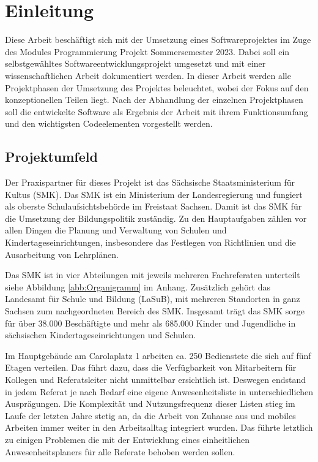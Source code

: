 \section{Einleitung}
\label{sec:Einleitung}
Diese Arbeit beschäftigt sich mit der Umsetzung eines Softwareprojektes im Zuge des Modules Programmierung Projekt Sommersemester 2023. Dabei soll ein selbstgewähltes Softwareentwicklungsprojekt umgesetzt und mit einer wissenschaftlichen Arbeit dokumentiert werden. In dieser Arbeit werden alle Projektphasen der Umsetzung des Projektes beleuchtet, wobei der Fokus auf den konzeptionellen Teilen liegt. Nach der Abhandlung der einzelnen Projektphasen soll die entwickelte Software als Ergebnis der Arbeit mit ihrem Funktionsumfang und den wichtigsten Codeelementen vorgestellt werden.

\subsection{Projektumfeld}
\label{sec:Projektumfeld}
Der Praxispartner für dieses Projekt ist das Sächsische Staatsministerium für Kultus (SMK). Das SMK ist ein Ministerium der Landesregierung und fungiert als oberste Schulaufsichtsbehörde im Freistaat Sachsen. Damit ist das SMK für die Umsetzung der Bildungspolitik zuständig. Zu den Hauptaufgaben zählen vor allen Dingen die Planung und Verwaltung von Schulen und Kindertageseinrichtungen, insbesondere das Festlegen von Richtlinien und die Ausarbeitung von Lehrplänen.

Das SMK ist in vier Abteilungen mit jeweils mehreren Fachreferaten unterteilt siehe Abbildung \ref{abb:Organigramm} im Anhang. Zusätzlich gehört das Landesamt für Schule und Bildung (LaSuB), mit mehreren Standorten in ganz Sachsen zum nachgeordneten Bereich des SMK. Insgesamt trägt das SMK sorge für über 38.000 Beschäftigte und mehr als 685.000 Kinder und Jugendliche in sächsischen Kindertageseinrichtungen und Schulen.

Im Hauptgebäude am Carolaplatz 1 arbeiten ca. 250 Bedienstete die sich auf fünf Etagen verteilen. Das führt dazu, dass die Verfügbarkeit von Mitarbeitern für Kollegen und Referatsleiter nicht unmittelbar ersichtlich ist. Deswegen endstand in jedem Referat je nach Bedarf eine eigene Anwesenheitsliste in unterschiedlichen Ausprägungen. Die Komplexität und Nutzungsfrequenz dieser Listen stieg im Laufe der letzten Jahre stetig an, da die Arbeit von Zuhause aus und mobiles Arbeiten immer weiter in den Arbeitsalltag integriert wurden. Das führte letztlich zu einigen Problemen die mit der Entwicklung eines einheitlichen Anwesenheitsplaners für alle Referate behoben werden sollen.

